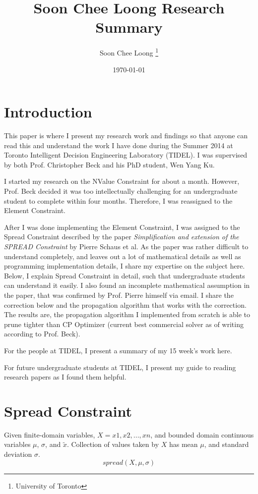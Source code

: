 \documentclass[a4paper,12pt]{article}
\begin{document}
\title{Soon Chee Loong Research Summary}
\author{Soon Chee Loong \thanks{University of Toronto} 
 }
\date {\today}

\maketitle 
\tableofcontents

\section{Introduction}

This paper is where I present my research work and findings so that anyone can read this and understand the work I have done during the Summer 2014 at Toronto Intelligent Decision Engineering Laboratory (TIDEL). 
I was supervised by both Prof. Christopher Beck and his PhD student, Wen Yang Ku. 

I started my research on the NValue Constraint for about a month. However, Prof. Beck decided it was too intellectually challenging for an undergraduate student to complete within four months. Therefore, I was reassigned to the Element Constraint. 

After I was done implementing the Element Constraint, I was assigned to the Spread Constraint described by the paper \textit{Simplification and extension of the SPREAD Constraint} by Pierre Schaus et al. As the paper was rather difficult to understand completely, and leaves out a lot of mathematical details as well as programming implementation details, I share my expertise on the subject here. Below, I explain Spread Constraint in detail, such that undergraduate students can understand it easily. I also found an incomplete mathematical assumption in the paper, that was confirmed by Prof. Pierre himself via email. I share the correction below and the propagation algorithm that works with the correction.
The results are, the propagation algorithm I implemented from scratch is able to prune tighter than CP Optimizer (current best commercial solver as of writing according to Prof. Beck). 

For the people at TIDEL, 
I present a summary of my 15 week's work here. 

For future undergraduate students at TIDEL,
I present my guide to reading research papers as I found them helpful. 

\section{Spread Constraint}
Given finite-domain variables, $X = {x1, x2, ... , xn}$, and bounded domain continuous variables $\mu$, $\sigma$, and $\tilde{x}$. Collection of values taken by $X$ has mean $\mu$, and standard deviation $\sigma$. 
$$spread(X,\mu,\sigma)$$
\end{document}
